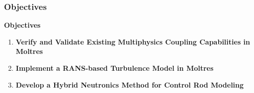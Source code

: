 \begin{frame}
  \frametitle{Objectives}
  \begin{block}{\textbf{Objectives}}
    \begin{enumerate}
      \item \textbf{Verify and Validate Existing Multiphysics Coupling Capabilities in Moltres}
      \item \textbf{Implement a RANS-based Turbulence Model in Moltres}
      \item \textbf{Develop a Hybrid Neutronics Method for Control Rod Modeling}
    \end{enumerate}
  \end{block}
\end{frame}
